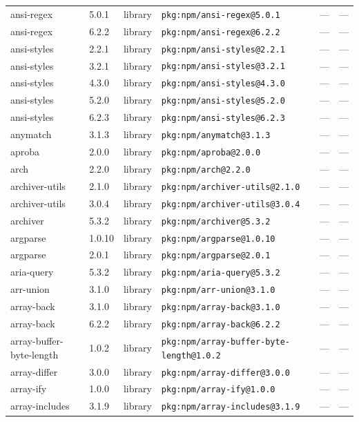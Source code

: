 \documentclass[11pt]{article}
\begin{document}
\begin{longtable}{|l|l|l|p{2.2cm}|l|p{4cm}|}
ansi-regex & 5.0.1 & library & \texttt{pkg:npm/ansi-regex@5.0.1} & — & — \\
ansi-regex & 6.2.2 & library & \texttt{pkg:npm/ansi-regex@6.2.2} & — & — \\
ansi-styles & 2.2.1 & library & \texttt{pkg:npm/ansi-styles@2.2.1} & — & — \\
ansi-styles & 3.2.1 & library & \texttt{pkg:npm/ansi-styles@3.2.1} & — & — \\
ansi-styles & 4.3.0 & library & \texttt{pkg:npm/ansi-styles@4.3.0} & — & — \\
ansi-styles & 5.2.0 & library & \texttt{pkg:npm/ansi-styles@5.2.0} & — & — \\
ansi-styles & 6.2.3 & library & \texttt{pkg:npm/ansi-styles@6.2.3} & — & — \\
anymatch & 3.1.3 & library & \texttt{pkg:npm/anymatch@3.1.3} & — & — \\
aproba & 2.0.0 & library & \texttt{pkg:npm/aproba@2.0.0} & — & — \\
arch & 2.2.0 & library & \texttt{pkg:npm/arch@2.2.0} & — & — \\
archiver-utils & 2.1.0 & library & \texttt{pkg:npm/archiver-utils@2.1.0} & — & — \\
archiver-utils & 3.0.4 & library & \texttt{pkg:npm/archiver-utils@3.0.4} & — & — \\
archiver & 5.3.2 & library & \texttt{pkg:npm/archiver@5.3.2} & — & — \\
argparse & 1.0.10 & library & \texttt{pkg:npm/argparse@1.0.10} & — & — \\
argparse & 2.0.1 & library & \texttt{pkg:npm/argparse@2.0.1} & — & — \\
aria-query & 5.3.2 & library & \texttt{pkg:npm/aria-query@5.3.2} & — & — \\
arr-union & 3.1.0 & library & \texttt{pkg:npm/arr-union@3.1.0} & — & — \\
array-back & 3.1.0 & library & \texttt{pkg:npm/array-back@3.1.0} & — & — \\
array-back & 6.2.2 & library & \texttt{pkg:npm/array-back@6.2.2} & — & — \\
array-buffer-byte-length & 1.0.2 & library & \texttt{pkg:npm/array-buffer-byte-length@1.0.2} & — & — \\
array-differ & 3.0.0 & library & \texttt{pkg:npm/array-differ@3.0.0} & — & — \\
array-ify & 1.0.0 & library & \texttt{pkg:npm/array-ify@1.0.0} & — & — \\
array-includes & 3.1.9 & library & \texttt{pkg:npm/array-includes@3.1.9} & — & — \\

\end{longtable}
\end{document}
